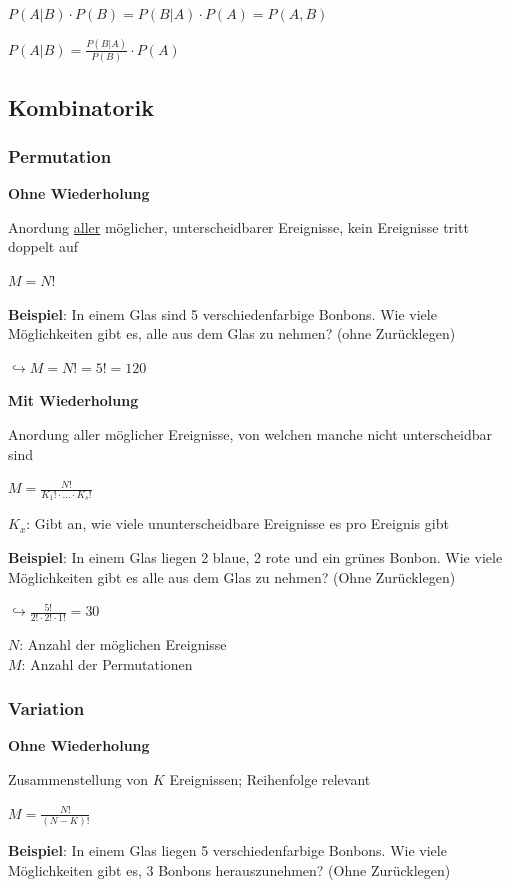 $\displaystyle{
    P(A|B) \cdot P(B) = P(B|A) \cdot P(A) = P(A,B)
}$

$\displaystyle{
    P(A|B) = \frac{P(B|A)}{P(B)} \cdot P(A)
}$

\subsection{Kombinatorik}

\subsubsection{Permutation}

\textbf{Ohne Wiederholung}

Anordung \underline{aller} möglicher, unterscheidbarer Ereignisse, kein Ereignisse tritt doppelt auf

$\displaystyle{
    M = N!
}$

\textbf{Beispiel}: In einem Glas sind 5 verschiedenfarbige Bonbons. Wie viele Möglichkeiten gibt es,
alle aus dem Glas zu nehmen? (ohne Zurücklegen)

$\hookrightarrow M = N! = 5! = 120$

\textbf{Mit Wiederholung}

Anordung aller möglicher Ereignisse, von welchen manche nicht unterscheidbar sind

$\displaystyle{
    M = \frac{N!}{K_1! \cdot ... \cdot K_s!}
}$

$K_x$: Gibt an, wie viele ununterscheidbare Ereignisse es pro Ereignis gibt

\textbf{Beispiel}: In einem Glas liegen 2 blaue, 2 rote und ein grünes Bonbon. Wie viele Möglichkeiten gibt es
alle aus dem Glas zu nehmen? (Ohne Zurücklegen)

$\displaystyle{
    \hookrightarrow \frac{5!}{2! \cdot 2! \cdot 1!} = 30
}$

$N$: Anzahl der möglichen Ereignisse\\
$M$: Anzahl der Permutationen

\subsubsection{Variation}

\textbf{Ohne Wiederholung}

Zusammenstellung von $K$ Ereignissen; Reihenfolge relevant

$\displaystyle{
    M = \frac{N!}{(N - K)!}
}$

\textbf{Beispiel}: In einem Glas liegen 5 verschiedenfarbige Bonbons. Wie viele Möglichkeiten gibt es, 3
Bonbons herauszunehmen? (Ohne Zurücklegen)


